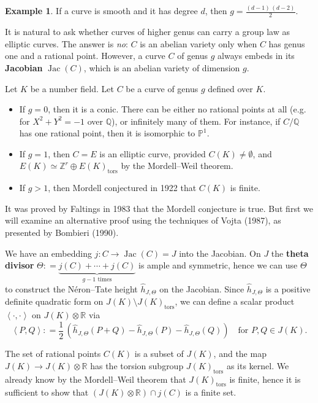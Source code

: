 \documentclass{article}
\theoremstyle{definition}
\newtheorem{example}[proposition]{Example}
\DeclareMathOperator{\Jac}{Jac}
\newcommand{\isom}{\simeq}
\newcommand{\term}{\textbf}
\newcommand{\dfn}{\mathrel{\mathop:}=}
\newcommand{\ZZ}{\mathbb{Z}}
\newcommand{\QQ}{\mathbb{Q}}
\newcommand{\RR}{\mathbb{R}}
\newcommand{\PP}{\mathbb{P}}
\begin{document}
\begin{example}
  If a curve is smooth and it has degree $d$, then $g = \frac{(d-1)\,(d-2)}{2}$.
\end{example}

It is natural to ask whether curves of higher genus can carry a group law as
elliptic curves. The answer is \emph{no}: $C$ is an abelian variety only when
$C$ has genus one and a rational point. However, a curve $C$ of genus $g$ always
embeds in its \term{Jacobian} $\Jac (C)$, which is an abelian variety of
dimension $g$.

\vspace{1em}

Let $K$ be a number field. Let $C$ be a curve of genus $g$ defined over $K$.

\begin{itemize}
\item If $g = 0$, then it is a conic. There can be either no rational points at
  all (e.g. for $X^2 + Y^2 = -1$ over $\QQ$), or infinitely many of them. For
  instance, if $C/\QQ$ has one rational point, then it is isomorphic to $\PP^1$.

\item If $g = 1$, then $C = E$ is an elliptic curve, provided
  $C (K) \ne \emptyset$, and $E (K) \isom \ZZ^r \oplus E (K)_\mathrm{tors}$ by
  the Mordell--Weil theorem.

\item If $g > 1$, then Mordell conjectured in 1922 that $C (K)$ is finite.
\end{itemize}

It was proved by Faltings in 1983 that the Mordell conjecture is true. But first
we will examine an alternative proof using the techniques of Vojta (1987),
as presented by Bombieri (1990).

We have an embedding $j\colon C\to \Jac (C) = J$ into the Jacobian. On $J$ the
\term{theta divisor}
$\Theta \dfn \underbrace{j (C) + \cdots + j (C)}_{g-1\text{ times}}$ is ample
and symmetric, hence we can use $\Theta$ to construct the N\'eron--Tate height
$\widehat{h}_{J,\Theta}$ on the Jacobian. Since $\widehat{h}_{J,\Theta}$ is a
positive definite quadratic form on $J (K)\setminus J(K)_\mathrm{tors}$, we can
define a scalar product $\left<\cdot,\cdot\right>$ on $J (K) \otimes \RR$ via
$$\left<P,Q\right> \dfn \frac{1}{2} \, (\widehat{h}_{J,\Theta} (P+Q) - \widehat{h}_{J,\Theta} (P) - \widehat{h}_{J,\Theta} (Q)) \quad \text{for }P,Q\in J (K).$$

The set of rational points $C (K)$ is a subset of $J (K)$, and the map
$J (K) \to J (K) \otimes \RR$ has the torsion subgroup $J (K)_\mathrm{tors}$ as
its kernel. We already know by the Mordell--Weil theorem that
$J (K)_\mathrm{tors}$ is finite, hence it is sufficient to show that
$(J (K) \otimes \RR) \cap j (C)$ is a finite set.
\end{document}
